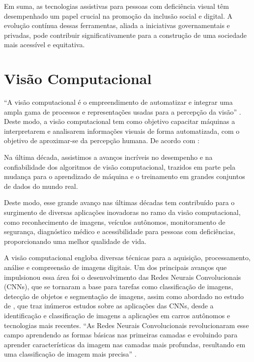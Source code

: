 Em suma, as tecnologias assistivas para pessoas com deficiência visual têm desempenhado um papel crucial na promoção da inclusão social e digital. A evolução contínua dessas ferramentas, aliada a iniciativas governamentais e privadas, pode contribuir significativamente para a construção de uma sociedade mais acessível e equitativa.

\section{Visão Computacional}
 
“A visão computacional é o empreendimento de automatizar e integrar uma ampla gama de processos e representações usadas para a percepção da visão” \cite{Ballard1982}. Deste modo, a visão computacional tem como objetivo capacitar máquinas a interpretarem e analisarem informações visuais de forma automatizada, com o objetivo de aproximar-se da percepção humana. De acordo com :

\begin{citacao}
    Na última década, assistimos a avanços incríveis no desempenho e na confiabilidade dos algoritmos de visão computacional, trazidos em parte pela mudança para o aprendizado de máquina e o treinamento em grandes conjuntos de dados do mundo real.
\end{citacao}

Deste modo, esse grande avanço nas últimas décadas tem contribuído para o surgimento de diversas aplicações inovadoras no ramo da visão computacional, como reconhecimento de imagens, veículos autônomos, monitoramento de segurança, diagnóstico médico e acessibilidade para pessoas com deficiências, proporcionando uma melhor qualidade de vida.

A visão computacional engloba diversas técnicas para a aquisição, processamento, análise e compreensão de imagens digitais. Um dos principais avanços que impulsionou essa área foi o desenvolvimento das Redes Neurais Convolucionais (CNNs), que se tornaram a base para tarefas como classificação de imagens, detecção de objetos e segmentação de imagens, assim como abordado no estudo de , que traz inúmeros estudos sobre as aplicações das CNNs, desde a identificação e classificação de imagens a aplicações em carros autônomos e tecnologias mais recentes. “As Redes Neurais Convolucionais revolucionaram esse campo aprendendo as formas básicas nas primeiras camadas e evoluindo para aprender características da imagem nas camadas mais profundas, resultando em uma classificação de imagem mais precisa” \cite{Jogin2018}.

